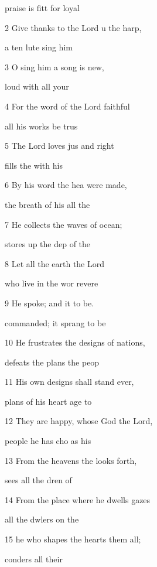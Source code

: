  praise is fitt for loyal  

2 Give thanks to the Lord u the harp, 

 a ten lute sing him  

3 O sing him a song  is new, 

 loud with all your  

4 For the word of the Lord  faithful 

 all his works  be trus 

5 The Lord loves jus and right 

 fills the  with his  

6 By his word the hea were made, 

 the breath of his  all the  

7 He collects the waves of  ocean; 

 stores up the dep of the  

8 Let all the earth  the Lord 

 who live in the wor revere  

9 He spoke; and it  to be. 

 commanded; it sprang to be 

10 He frustrates the designs of  nations, 

 defeats the plans  the peop 

11 His own designs shall stand  ever, 

 plans of his heart  age to  

12 They are happy, whose God  the Lord, 

 people he has cho as his  

13 From the heavens the  looks forth, 

 sees all the dren of  

14 From the place where he dwells  gazes 

 all the dwlers on the  

15 he who shapes the hearts  them all; 

 conders all their  

